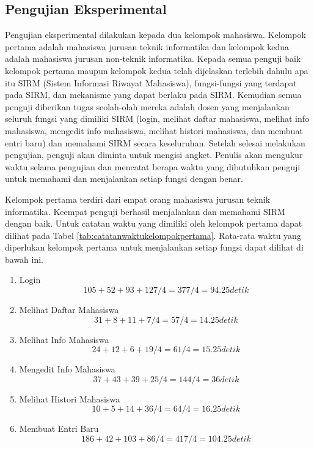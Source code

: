 \subsection{Pengujian Eksperimental}
\label{sec:pengujianeksperimantal}
Pengujian eksperimental dilakukan kepada dua kelompok mahasiswa. Kelompok
pertama adalah mahasiswa jurusan teknik informatika dan kelompok kedua
adalah mahasiswa jurusan non-teknik informatika. Kepada semua penguji baik
kelompok pertama maupun kelompok kedua telah dijelaskan terlebih dahulu apa itu
SIRM (Sistem Informasi Riwayat Mahasiswa), fungsi-fungsi yang terdapat pada
SIRM, dan mekanisme yang dapat berlaku pada SIRM. Kemudian semua penguji
diberikan tugas seolah-olah mereka adalah dosen yang menjalankan seluruh fungsi
yang dimiliki SIRM (login, melihat daftar mahasiswa, melihat info mahasiswa,
mengedit info mahasiswa, melihat histori mahasiswa, dan membuat entri baru) dan
memahami SIRM secara keseluruhan. Setelah selesai melakukan pengujian, penguji
akan diminta untuk mengisi angket. Penulis akan mengukur waktu selama pengujian
dan mencatat berapa waktu yang dibutuhkan penguji untuk memahami dan menjalankan
setiap fungsi dengan benar.

Kelompok pertama terdiri dari empat orang mahasiswa jurusan teknik informatika.
Keempat penguji berhasil menjalankan dan memahami SIRM dengan baik. Untuk
catatan waktu yang dimiliki oleh kelompok pertama dapat dilihat pada Tabel
\ref{tab:catatanwaktukelompokpertama}. Rata-rata waktu yang diperlukan
kelompok pertama untuk menjalankan setiap fungsi dapat dilihat di bawah ini.
\begin{enumerate}[1]
  \item Login\\
  $$105 + 52 + 93 + 127 / 4 = 377 / 4 = 94.25 detik$$
  \item Melihat Daftar Mahasiswa
  $$31 + 8 + 11 + 7 / 4 = 57 / 4 = 14.25 detik$$
  \item Melihat Info Mahasiswa
  $$24 + 12 + 6 + 19 / 4 = 61 / 4 = 15.25 detik$$
  \item Mengedit Info Mahasiswa
  $$37 + 43 + 39 + 25 / 4 = 144 / 4 = 36 detik$$
  \item Melihat Histori Mahasiswa
  $$10 + 5 + 14 + 36 / 4 = 64 / 4 = 16.25 detik$$
  \item Membuat Entri Baru
  $$186 + 42 + 103 + 86 / 4 = 417 / 4 = 104.25 detik$$
\end{enumerate}

